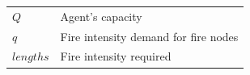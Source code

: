 \documentclass[preprint,review, 11pt,3p,authoryear]{elsarticle}
\newcommand{\rev}{\color{black}} %
\begin{document}
\begin{table}[!htbp]
\begin{tabular}{ll}
$Q$                          & Agent's capacity \\
$q$                          & Fire intensity demand for fire nodes  \\

$lengths$                          & Fire intensity required   \\
\end{tabular}
\end{table}












\end{document}
